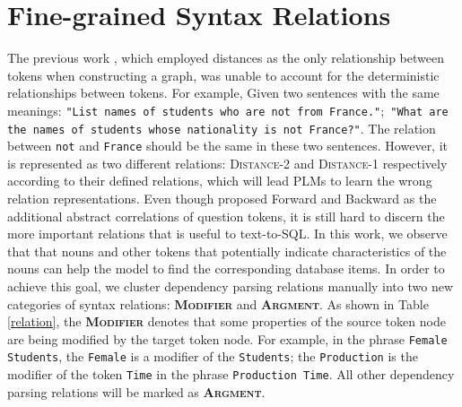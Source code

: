 \documentclass[letterpaper]{article} \usepackage{aaai23}  \usepackage{times}  \usepackage{helvet}  \usepackage{courier}  \usepackage[hyphens]{url}  \usepackage{graphicx} \usepackage{amsmath}
\begin{document}
\section{Fine-grained Syntax Relations}
The previous work \citep{lgesql, wang-etal-2020-rat}, which employed distances as the only relationship between tokens when constructing a graph, was unable to account for the deterministic relationships between tokens. For example, Given two sentences with the same meanings: \texttt{"List names of students who are not from France."};\texttt{ "What are the names of students whose nationality is not France?"}. The relation between \texttt{not} and \texttt{France} should be the same in these two sentences. However, it is represented as two different relations: \textsc{Distance-2} and \textsc{Distance-1} respectively according to their defined relations, which will lead PLMs to learn the wrong relation representations. Even though \citet{s2sql} proposed Forward and Backward as the additional abstract correlations of question tokens, it is still hard to discern the more important relations that is useful to text-to-SQL. In this work, we observe that that nouns and other tokens that potentially indicate characteristics of the nouns can help the model to find the corresponding database items. In order to achieve this goal, we cluster dependency parsing relations manually into two new categories of syntax relations: \textsc{\textbf{Modifier}} and \textsc{\textbf{Argment}}. As shown in Table \ref{relation}, the \textsc{\textbf{Modifier}} denotes that some properties of the source token node are being modified by the target token node. For example, in the phrase \texttt{Female Students}, the \texttt{Female} is a modifier of the \texttt{Students}; the \texttt{Production} is the modifier of the token \texttt{Time} in the phrase \texttt{Production Time}. All other dependency parsing relations will be marked as \textsc{\textbf{Argment}}.
\end{document}
